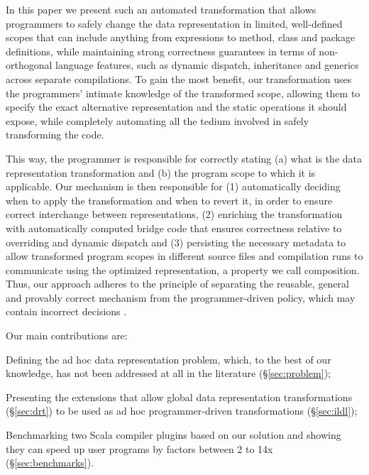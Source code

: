 In this paper we present such an automated transformation that allows
programmers to safely change the data representation in limited,
well-defined scopes that can include anything from expressions to
method, class and package definitions, while maintaining strong
correctness guarantees in terms of non-orthogonal language features,
such as dynamic dispatch, inheritance and generics across separate
compilations.
To gain the most benefit, our transformation uses the programmers'
intimate knowledge of the transformed scope, allowing them to specify
the exact alternative representation and the static operations it
should expose, while completely automating all the tedium involved in
safely transforming the code.

This way, the programmer is responsible for correctly stating (a)
what is the data representation transformation and (b) the program
scope to which it is applicable. Our mechanism is then
responsible for (1) automatically deciding when to apply the
transformation and when to revert it, in order to ensure correct
interchange between representations, (2) enriching the transformation
with automatically computed bridge code that ensures correctness
relative to overriding and dynamic dispatch and (3) persisting
the necessary metadata to allow transformed program scopes in
different source files and compilation runs to communicate using
the optimized representation, a property we call composition.
Thus, our approach adheres to the principle of separating the
reusable, general and provably correct mechanism from the
programmer-driven policy, which may contain incorrect
decisions \cite{lampson-mechanism-policy}.

Our main contributions are:
\begin{compactitem}
  \item Defining the ad hoc data representation problem, which, to the
    best of our knowledge, has not been addressed at all in the
    literature (\S\ref{sec:problem});
  \item Presenting the extensions that allow global data
    representation transformations (\S\ref{sec:drt}) to be used as
    ad hoc programmer-driven transformations (\S\ref{sec:ildl});
  \item Benchmarking two Scala compiler plugins based on our solution
    and showing they can speed up user programs by factors between 2
    to 14x (\S\ref{sec:benchmarks}).
\end{compactitem}

